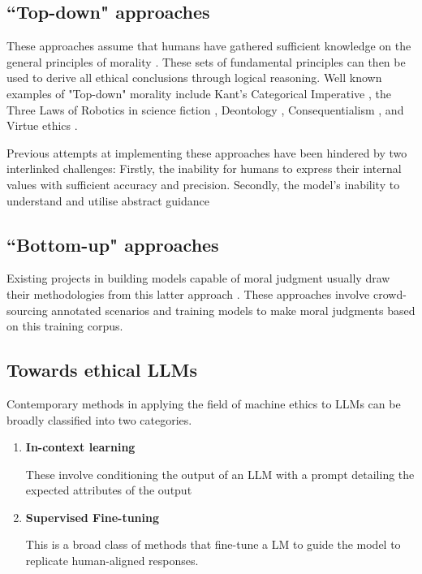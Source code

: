 \documentclass{article}
\begin{document}
\subsection{``Top-down" approaches}
These approaches assume that humans have gathered sufficient knowledge on the general principles of morality \cite{tolmeijer_implementations_2021}. These sets of fundamental principles can then be used to derive all ethical conclusions through logical reasoning. Well known examples of "Top-down" morality include Kant's Categorical Imperative \cite{kant_groundwork_1785}, the Three Laws of Robotics in science fiction \cite{asimov1942runaround}, Deontology \cite{alexander_deontological_2021}, Consequentialism \cite{sinnott-armstrong_consequentialism_2023}, and Virtue ethics \cite{hursthouse_virtue_2023}. 

Previous attempts at implementing these approaches have been hindered by two interlinked challenges: Firstly, the inability for humans to express their internal values with sufficient accuracy and precision. Secondly, the model's inability to understand and utilise abstract guidance \cite{jiang_can_2022}\cite{zhao_ethical-advice_2021}

\subsection{``Bottom-up" approaches}

Existing projects in building models capable of moral judgment usually draw their methodologies from this latter approach \cite{hendrycks_aligning_2023}\cite{jiang_can_2022}\cite{ziems_moral_2022}. These approaches involve crowd-sourcing annotated scenarios and training models to make moral judgments based on this training corpus. 


\subsection{Towards ethical LLMs}
Contemporary methods in applying the field of machine ethics to LLMs can be broadly classified into two categories. 
\begin{enumerate}
    \item \textbf{In-context learning} 
    
    These involve conditioning the output of an LLM with a prompt detailing the expected attributes of the output \cite{schick_self-diagnosis_2021}\cite{zhao_ethical-advice_2021}
    
    \item \textbf{Supervised Fine-tuning} 
    
    This is a broad class of methods that fine-tune a LM to guide the model to replicate human-aligned responses\cite{liu_aligning_2022}\cite{ganguli_capacity_2023}.
\end{enumerate}
\end{document}
